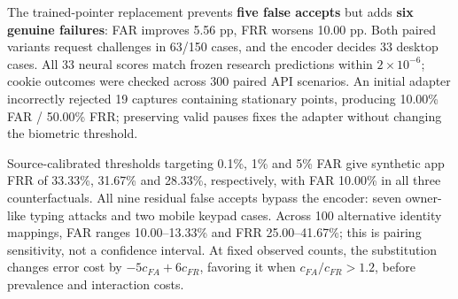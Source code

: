 \documentclass[10pt,a4paper]{article}
\begin{document}
\begin{center}
\end{center}

The trained-pointer replacement prevents \textbf{five false accepts} but adds \textbf{six genuine failures}: FAR improves 5.56 pp, FRR worsens 10.00 pp. Both paired variants request challenges in 63/150 cases, and the encoder decides 33 desktop cases. All 33 neural scores match frozen research predictions within $2\times10^{-6}$; cookie outcomes were checked across 300 paired API scenarios. An initial adapter incorrectly rejected 19 captures containing stationary points, producing 10.00\% FAR / 50.00\% FRR; preserving valid pauses fixes the adapter without changing the biometric threshold.

Source-calibrated thresholds targeting 0.1\%, 1\% and 5\% FAR give synthetic app FRR of 33.33\%, 31.67\% and 28.33\%, respectively, with FAR 10.00\% in all three counterfactuals. All nine residual false accepts bypass the encoder: seven owner-like typing attacks and two mobile keypad cases. Across 100 alternative identity mappings, FAR ranges 10.00--13.33\% and FRR 25.00--41.67\%; this is pairing sensitivity, not a confidence interval. At fixed observed counts, the substitution changes error cost by $-5c_{FA}+6c_{FR}$, favoring it when $c_{FA}/c_{FR}>1.2$, before prevalence and interaction costs.
\end{document}
